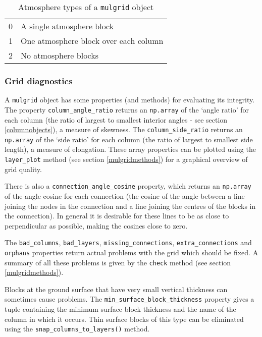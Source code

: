 \begin{table}
  \begin{center}
    \begin{tabular}{|l|l|}
      \hline
      0 & A single atmosphere block \\
      1 & One atmosphere block over each column \\
      2 & No atmosphere blocks \\
      \hline
    \end{tabular}
    \caption{Atmosphere types of a \texttt{mulgrid} object}
    \label{tb:mulgrid_atmosphere_types}
  \end{center}
\end{table}

\subsubsection{Grid diagnostics}

A \texttt{mulgrid} object has some properties (and methods) for evaluating its integrity.  The property \texttt{column\_angle\_ratio} returns an \texttt{np.array} of the `angle ratio' for each column (the ratio of largest to smallest interior angles - see section \ref{columnobjects}), a measure of skewness.  The \texttt{column\_side\_ratio} returns an \texttt{np.array} of the `side ratio' for each column (the ratio of largest to smallest side length), a measure of elongation.  These array properties can be plotted using the \texttt{layer\_plot} method (see section \ref{mulgridmethods}) for a graphical overview of grid quality.

There is also a \texttt{connection\_angle\_cosine} property, which returns an \texttt{np.array} of the angle cosine for each connection (the cosine of the angle between a line joining the nodes in the connection and a line joining the centres of the blocks in the connection).  In general it is desirable for these lines to be as close to perpendicular as possible, making the cosines close to zero.

The \texttt{bad\_columns}, \texttt{bad\_layers}, \texttt{missing\_connections}, \texttt{extra\_connections} and \texttt{orphans} properties return actual problems with the grid which should be fixed.  A summary of all these problems is given by the \texttt{check} method (see section \ref{mulgridmethods}).

Blocks at the ground surface that have very small vertical thickness can sometimes cause problems.  The \texttt{min\_surface\_block\_thickness} property gives a tuple containing the minimum surface block thickness and the name of the column in which it occurs.  Thin surface blocks of this type can be eliminated using the \texttt{snap\_columns\_to\_layers()} method.

